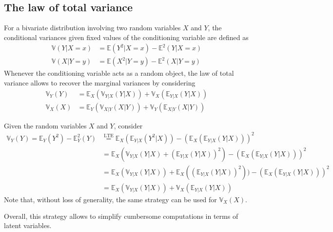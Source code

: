 \documentclass{report}
\begin{document}
\subsection{The law of total variance}
For a bivariate distribution involving two random variables $\displaystyle X$ and $\displaystyle Y$, the conditional variances given fixed values of the conditioning variable are defined as
\begin{align*}
    \mathbb{V}(Y|X = x) &= \mathbb{E}(Y^2|X = x) - \mathbb{E}^2(Y|X = x) \\
    \mathbb{V}(X|Y = y) &= \mathbb{E}(X^2|Y = y) - \mathbb{E}^2(X|Y = y)
\end{align*}
Whenever the conditioning variable acts as a random object, the law of total variance allows to recover the marginal variances by considering
\begin{align*}
    \mathbb{V}_Y(Y) &= \mathbb{E}_X(\mathbb{V}_{Y|X}(Y|X)) + \mathbb{V}_X(\mathbb{E}_{Y|X}(Y|X)) \\
    \mathbb{V}_X(X) &= \mathbb{E}_Y(\mathbb{V}_{X|Y}(X|Y)) + \mathbb{V}_Y(\mathbb{E}_{X|Y}(X|Y))
\end{align*}
\begin{proofbox}
    Given the random variables $\displaystyle X$ and $\displaystyle Y$, consider
    \begin{align*}
        \mathbb{V}_Y(Y) = \mathbb{E}_Y(Y^2) - \mathbb{E}_Y^2(Y)
            &\stackrel{\text{LTE}}{=} \mathbb{E}_X(\mathbb{E}_{Y|X}(Y^2|X)) - (\mathbb{E}_X(\mathbb{E}_{Y|X}(Y|X)))^2 \\
            &= \mathbb{E}_X(\mathbb{V}_{Y|X}(Y|X) + (\mathbb{E}_{Y|X}(Y|X))^2) - (\mathbb{E}_X(\mathbb{E}_{Y|X}(Y|X)))^2 \\
            &= \mathbb{E}_X(\mathbb{V}_{Y|X}(Y|X)) + \mathbb{E}_X((\mathbb{E}_{Y|X}(Y|X))^2)) - (\mathbb{E}_X(\mathbb{E}_{Y|X}(Y|X)))^2 \\
            &= \mathbb{E}_X(\mathbb{V}_{Y|X}(Y|X)) + \mathbb{V}_X(\mathbb{E}_{Y|X}(Y|X))
    \end{align*}
    Note that, without loss of generality, the same strategy can be used for $\displaystyle \mathbb{V}_X(X)$.
\end{proofbox}
\noindent Overall, this strategy allows to simplify cumbersome computations in terms of latent variables.
\end{document}
